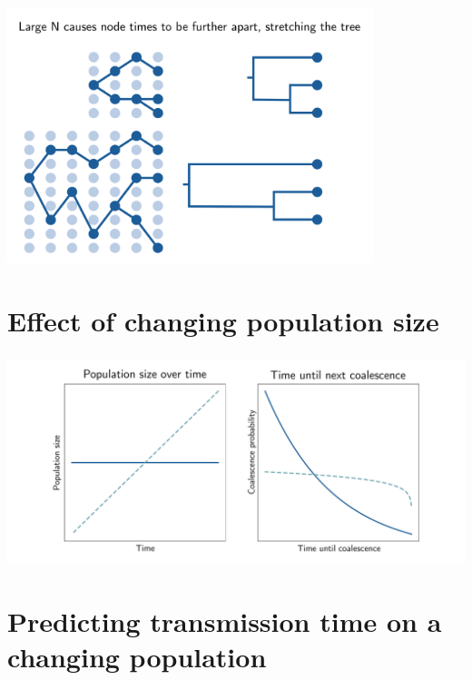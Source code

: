 \documentclass[aspectratio=169]{beamer}
\begin{document}
\begin{frame} \frametitle{\insertsection}

        \centering\includegraphics[width=0.8\textwidth]{images/coalescence}

\end{frame}

\section{Effect of changing population size}

\begin{frame} \frametitle{\insertsection}

    \centering\includegraphics[width=\textwidth]{images/population-comparison}

\end{frame}

\section{Predicting transmission time on a changing population}
\end{document}
